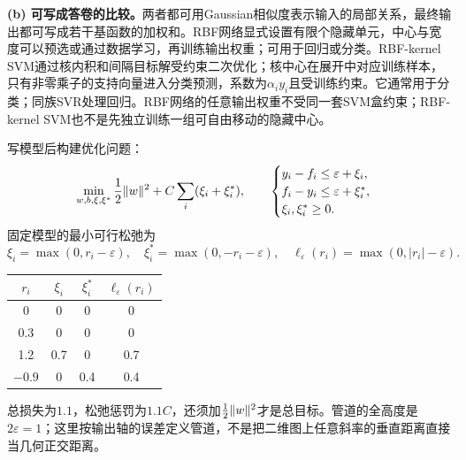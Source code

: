 \textbf{(b) 可写成答卷的比较。}两者都可用Gaussian相似度表示输入的局部关系，最终输出都可写成若干基函数的加权和。RBF网络显式设置有限个隐藏单元，中心与宽度可以预选或通过数据学习，再训练输出权重；可用于回归或分类。RBF-kernel SVM通过核内积和间隔目标解受约束二次优化；核中心在展开中对应训练样本，只有非零乘子的支持向量进入分类预测，系数为$\alpha_i y_i$且受训练约束。它通常用于分类；同族SVR处理回归。RBF网络的任意输出权重不受同一套SVM盒约束；RBF-kernel SVM也不是先独立训练一组可自由移动的隐藏中心。


\solve
写模型后构建优化问题：
\[
\min_{w,b,\xi,\xi^*}\frac12\lVert w\rVert^2+C\sum_i(\xi_i+\xi_i^*),
\qquad
\begin{cases}
y_i-f_i\le\varepsilon+\xi_i,\\
f_i-y_i\le\varepsilon+\xi_i^*,\\
\xi_i,\xi_i^*\ge0.
\end{cases}
\]
固定模型的最小可行松弛为
\[
\xi_i=\max(0,r_i-\varepsilon),\quad
\xi_i^*=\max(0,-r_i-\varepsilon),\quad
\ell_\varepsilon(r_i)=\max(0,|r_i|-\varepsilon).
\]
\begin{center}\begin{tabular}{@{}cccc@{}}\toprule
$r_i$&$\xi_i$&$\xi_i^*$&$\ell_\varepsilon(r_i)$\\\midrule
0&0&0&0\\
0.3&0&0&0\\
1.2&0.7&0&0.7\\
$-0.9$&0&0.4&0.4\\\bottomrule
\end{tabular}\end{center}
总损失为$1.1$，松弛惩罚为$1.1C$，还须加$\tfrac12\lVert w\rVert^2$才是总目标。管道的全高度是$2\varepsilon=1$；这里按输出轴的误差定义管道，不是把二维图上任意斜率的垂直距离直接当几何正交距离。

